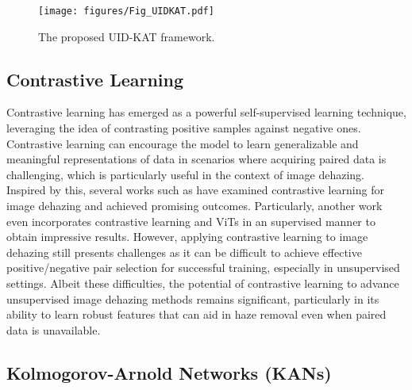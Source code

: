 \begin{figure*}
    \centering
    \texttt{[image: figures/Fig\_UIDKAT.pdf]}
    \caption{The proposed UID-KAT framework.}
    \label{fig:framework} 
\end{figure*}


\subsection{Contrastive Learning}
\label{subsec:contrastivelearning}

Contrastive learning has emerged as a powerful self-supervised learning technique, leveraging the idea of contrasting positive samples against negative ones. Contrastive learning can encourage the model to learn generalizable and meaningful representations of data in scenarios where acquiring paired data is challenging, which is particularly useful in the context of image dehazing. Inspired by this, several works such as \cite{wu2021contrastive,wang2024ucl} have examined contrastive learning for image dehazing and achieved promising outcomes. Particularly, another work \cite{wang2023uscformer} even incorporates contrastive learning and ViTs in an supervised manner to obtain impressive results. However, applying contrastive learning to image dehazing still presents challenges as it can be difficult to achieve effective positive/negative pair selection for successful training, especially in unsupervised settings. Albeit these difficulties, the potential of contrastive learning to advance unsupervised image dehazing methods remains significant, particularly in its ability to learn robust features that can aid in haze removal even when paired data is unavailable.


\subsection{Kolmogorov-Arnold Networks (KANs)}
\label{subsec:kan}

